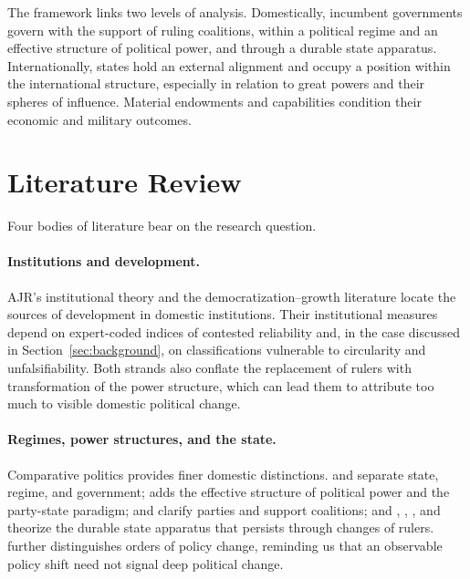 \documentclass[11pt]{article}
\begin{document}
The framework links two levels of analysis. Domestically, incumbent governments govern with the support of ruling coalitions, within a political regime and an effective structure of political power, and through a durable state apparatus. Internationally, states hold an external alignment and occupy a position within the international structure, especially in relation to great powers and their spheres of influence. Material endowments and capabilities condition their economic and military outcomes.

\section{Literature Review}
\label{sec:lit_review}

Four bodies of literature bear on the research question.

\paragraph{Institutions and development.} AJR's institutional theory \parencite{acemoglu_johnson_robinson_2001,acemoglu_johnson_robinson_2005,acemoglu_robinson_2012} and the democratization--growth literature \parencite{acemoglu_naidu_restrepo_robinson_2019} locate the sources of development in domestic institutions. Their institutional measures depend on expert-coded indices of contested reliability \parencite{treier_jackman_2008,little_meng_2024} and, in the case discussed in Section~\ref{sec:background}, on classifications vulnerable to circularity and unfalsifiability. Both strands also conflate the replacement of rulers with transformation of the power structure, which can lead them to attribute too much to visible domestic political change.

\paragraph{Regimes, power structures, and the state.} Comparative politics provides finer domestic distinctions. \textcite{linz_stepan_1996} and \textcite{linz_2000} separate state, regime, and government; \textcite{garciatrevijano2010} adds the effective structure of political power and the party-state paradigm; \textcite{sartori_1976} and \textcite{bueno_de_mesquita_2003} clarify parties and support coalitions; and \textcite{weber1922wirtschaft}, \textcite{althusser_1971}, \textcite{tilly_1990}, and \textcite{skocpol_1979} theorize the durable state apparatus that persists through changes of rulers. \textcite{hall_1993} further distinguishes orders of policy change, reminding us that an observable policy shift need not signal deep political change.
\end{document}

